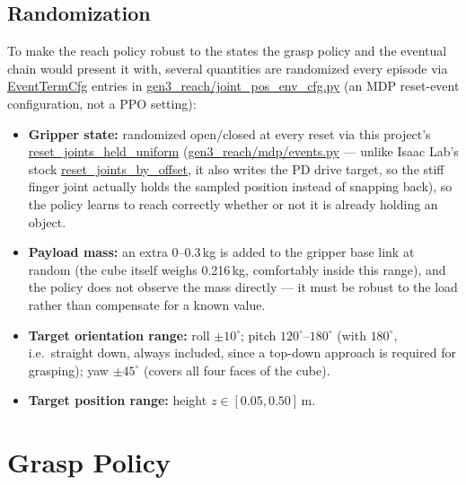 \documentclass[11pt]{article}
\begin{document}
\subsection{Randomization}

To make the reach policy robust to the states the grasp policy and the eventual
chain would present it with, several quantities are randomized every episode via
\url{EventTermCfg} entries in \url{gen3_reach/joint_pos_env_cfg.py} (an MDP
reset-event configuration, not a PPO setting):

\begin{itemize}
    \item \textbf{Gripper state:} randomized open/closed at every reset via this
    project's \url{reset_joints_held_uniform} (\url{gen3_reach/mdp/events.py}
    --- unlike Isaac Lab's stock \url{reset_joints_by_offset}, it also writes the
    PD drive target, so the stiff finger joint actually holds the sampled position
    instead of snapping back), so the
    policy learns to reach correctly whether or not it is already holding an
    object.
    \item \textbf{Payload mass:} an extra $0$--$0.3$\,kg is added to the gripper
    base link at random (the cube itself weighs 0.216\,kg, comfortably inside this
    range), and the policy does not observe the mass directly --- it must be
    robust to the load rather than compensate for a known value.
    \item \textbf{Target orientation range:} roll $\pm10^\circ$; pitch
    $120^\circ$--$180^\circ$ (with $180^\circ$, i.e.\ straight down, always
    included, since a top-down approach is required for grasping); yaw
    $\pm45^\circ$ (covers all four faces of the cube).
    \item \textbf{Target position range:} height $z \in [0.05, 0.50]$\,m.
\end{itemize}

\section{Grasp Policy}
\label{sec:grasp}
\end{document}
